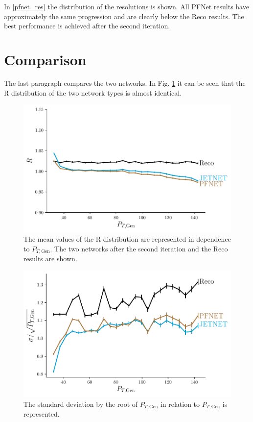 \documentclass[12pt, a4paper]{thesis}
\begin{document}
In \ref{pfnet_res} the distribution of the resolutions is shown. All
PFNet results have approximately the same progression and are clearly
below the Reco results. The best performance is achieved after the
second iteration.

\section{Comparison}
\label{sec:org638f190}

The last paragraph compares the two networks. In Fig. \ref{comp_R} it
can be seen that the R distribution of the two network types is almost
identical.

\begin{figure}[H]
  \centering
  \includegraphics[width=.9\linewidth]{../images/comp_R.pdf}
  \caption{The mean values of the R distribution are represented in
    dependence to \(P_{T, \text{Gen}}\). The two networks after the
    second iteration and the Reco results are shown.}
  \label{comp_R}
\end{figure}

\begin{figure}[H]
  \centering
  \includegraphics[width=.9\linewidth]{../images/comp_res.pdf}
  \caption{The standard deviation by the root of \(P_{T, \text{Gen}}\)
    in relation to \(P_{T, \text{Gen}}\) is represented.}
  \label{comp_res}
\end{figure}
\end{document}
